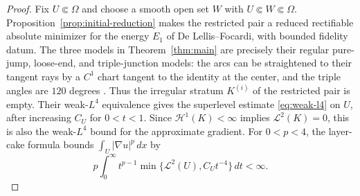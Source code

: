 \begin{proof}
Fix $U\Subset\Omega$ and choose a smooth open set $W$ with
$U\Subset W\Subset\Omega$. Proposition~\ref{prop:initial-reduction}
makes the restricted pair a reduced rectifiable absolute minimizer for
the energy $E_1$ of De Lellis--Focardi, with bounded fidelity datum.
The three models in Theorem~\ref{thm:main} are precisely their regular
pure-jump, loose-end, and triple-junction models: the arcs can be
straightened to their tangent rays by a $C^1$ chart tangent to the
identity at the center, and the triple angles are $120$ degrees
\cite[Definitions~1.3.2 and~1.5.1]{delellis_focardi2025}.
Thus the irregular stratum $K^{(i)}$ of the restricted pair is empty.
Their weak-$L^4$ equivalence
\cite[Theorem~1.5.4; see also Theorem~6.1.6]{delellis_focardi2025}
gives the superlevel estimate \eqref{eq:weak-l4} on $U$, after increasing
$C_U$ for $0<t<1$. Since $\mathcal H^1(K)<\infty$ implies
$\mathcal L^2(K)=0$, this is also the weak-$L^4$ bound for the approximate
gradient. For $0<p<4$, the layer-cake formula bounds
$\int_U|\nabla u|^p\,dx$ by
\[
 p\int_0^\infty t^{p-1}
   \min\{\mathcal L^2(U),C_Ut^{-4}\}\,dt<\infty.
\]
\end{proof}
